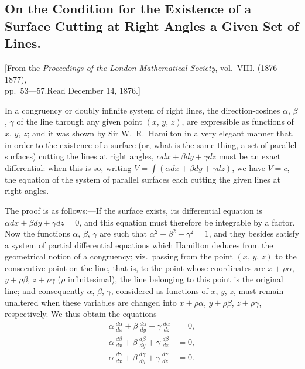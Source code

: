\documentclass[11pt,a4paper]{book}
\begin{document}
\subsection*{On the Condition for the Existence of a Surface Cutting at Right Angles a Given Set of Lines.}

\begin{center}
\small
[From the \textit{Proceedings of the London Mathematical Society}, vol.~VIII. (1876---1877),\\
pp.~53---57.\quad Read December 14, 1876.]
\end{center}

\medskip
\noindent
In a congruency or doubly infinite system of right lines, the direction-cosines $\alpha$, $\beta$, $\gamma$ of the line through any given point $(x,\,y,\,z)$, are expressible as functions of $x$, $y$, $z$; and it was shown by Sir W.~R.~Hamilton in a very elegant manner that, in order to the existence of a surface (or, what is the same thing, a set of parallel surfaces) cutting the lines at right angles, $\alpha dx + \beta dy + \gamma dz$ must be an exact differential: when this is so, writing $V = \int(\alpha dx + \beta dy + \gamma dz)$, we have $V = c$, the equation of the system of parallel surfaces each cutting the given lines at right angles.

The proof is as follows:---If the surface exists, its differential equation is $\alpha dx + \beta dy + \gamma dz = 0$, and this equation must therefore be integrable by a factor. Now the functions $\alpha$, $\beta$, $\gamma$ are such that $\alpha^2 + \beta^2 + \gamma^2 = 1$, and they besides satisfy a system of partial differential equations which Hamilton deduces from the geometrical notion of a congruency; viz.\ passing from the point $(x,\,y,\,z)$ to the consecutive point on the line, that is, to the point whose coordinates are $x + \rho\alpha$, $y + \rho\beta$, $z + \rho\gamma$ ($\rho$ infinitesimal), the line belonging to this point is the original line; and consequently $\alpha$, $\beta$, $\gamma$, considered as functions of $x$, $y$, $z$, must remain unaltered when these variables are changed into $x + \rho\alpha$, $y + \rho\beta$, $z + \rho\gamma$, respectively. We thus obtain the equations
\begin{align*}
\alpha\,\frac{d\alpha}{dx} + \beta\,\frac{d\alpha}{dy} + \gamma\,\frac{d\alpha}{dz} &= 0, \\
\alpha\,\frac{d\beta}{dx} + \beta\,\frac{d\beta}{dy} + \gamma\,\frac{d\beta}{dz} &= 0, \\
\alpha\,\frac{d\gamma}{dx} + \beta\,\frac{d\gamma}{dy} + \gamma\,\frac{d\gamma}{dz} &= 0.
\end{align*}
\end{document}
